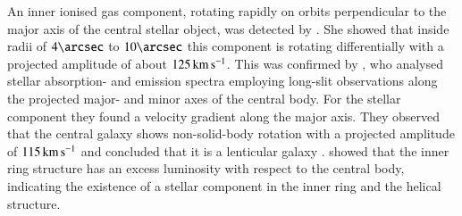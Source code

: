 \documentclass[oldversion]{aa}
\begin{document}
An inner ionised gas component, rotating rapidly on orbits
perpendicular to the major axis of the central stellar object, was
detected by \citet[][]{Ulrich75}. She showed that inside radii of
$4\arcsec$ to $10\arcsec$ this component is rotating differentially
with a projected amplitude of about $125\,{\rm km}\,{\rm
s}^{-1}$. This was confirmed by \citet[][]{Schechter78}, who analysed
stellar absorption- and emission spectra employing long-slit
observations along the projected major- and minor axes of the central
body. For the stellar component they found a velocity gradient along
the major axis. They observed that the central galaxy shows
non-solid-body rotation with a projected amplitude of $115\,{\rm
km}\,{\rm s}^{-1}$ and concluded that it is a lenticular galaxy
\citep[see also][]{Whitmore90,Emsellem04}. \citet[][]{Whitmore90}
showed that the inner ring structure has an excess luminosity with
respect to the central body, indicating the existence of a stellar
component in the inner ring and the helical structure.
%
%
\end{document}
